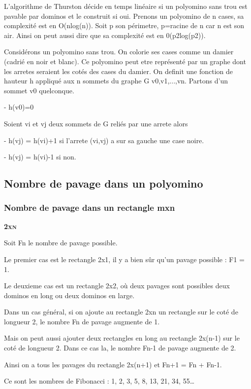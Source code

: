 \documentclass{article}
\begin{document}
L'algorithme de Thurston décide en temps linéaire si un polyomino sans trou est pavable par dominos et le construit si oui.
Prenons un polyomino de n cases, sa complexité est en O(nlog(n)). Soit p son périmetre, p=racine de n car n est son air.
Ainsi on peut aussi dire que sa complexité est en 0(p2log(p2)).

Considérons un polyomino sans trou. On colorie ses cases comme un damier (cadrié en noir et blanc). Ce polyomino peut etre représenté par un graphe dont les arretes seraient les cotés des cases du damier.
On definit une fonction de hauteur h appliqué aux n sommets du graphe G {v0,v1,...,vn}.
Partons d'un sommet v0 quelconque.

- h(v0)=0

Soient vi et vj deux sommets de G reliés par une arrete alors

- h(vj) = h(vi)+1 si l'arrete (vi,vj) a sur sa gauche une case noire.

- h(vj) = h(vi)-1 si non.

\subsection{Nombre de pavage dans un polyomino}

\subsubsection{Nombre de pavage dans un rectangle mxn}



\textbf{\textsc{2xn}}


Soit Fn le nombre de pavage possible.

Le premier cas est le rectangle 2x1, il y a bien sûr qu’un pavage possible : F1 = 1.

Le deuxieme cas est un rectangle 2x2, où deux pavages sont possibles deux dominos en long ou deux dominos en large.

Dans un cas général, si on ajoute au rectangle 2xn un rectangle sur le coté de longueur 2, le nombre Fn de pavage augmente de 1.

Mais on peut aussi ajouter deux rectangles en long au rectangle 2x(n-1) sur le coté de longueur 2. Dans ce cas la, le nombre Fn-1 de pavage augmente de 2.

Ainsi on a tous les pavages du rectangle 2x(n+1) et Fn+1 = Fn + Fn-1.

Ce sont les nombres de Fibonacci : 1, 2, 3, 5, 8, 13, 21, 34, 55…
\end{document}

